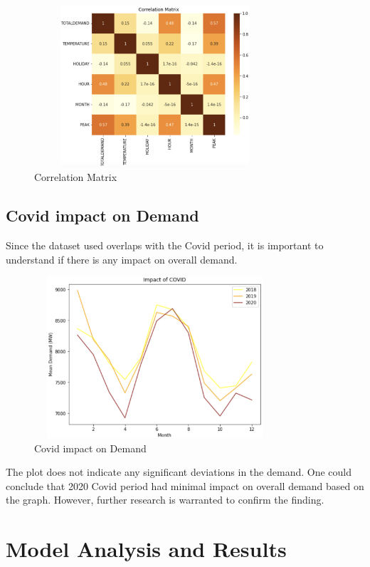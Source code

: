 \documentclass[mstat,12pt]{unswthesis}
\begin{document}
\begin{figure}[H]
\centering
\includegraphics[width=0.80\textwidth,height=6cm]{correlation_matrix.png}
\caption{Correlation Matrix}
\label{correlation_matrix}
\end{figure}

\section{Covid impact on Demand}\label{covid-impact-on-demand}

Since the dataset used overlaps with the Covid period, it is important
to understand if there is any impact on overall demand.

\begin{figure}[H]
\centering
\includegraphics[width=0.80\textwidth,height=6cm]{covid_impact.png}
\caption{Covid impact on Demand}
\label{covid_impact}
\end{figure}

The plot does not indicate any significant deviations in the demand. One
could conclude that 2020 Covid period had minimal impact on overall
demand based on the graph. However, further research is warranted to
confirm the finding.

\chapter{Model Analysis and Results}\label{model-analysis-and-results}
\end{document}
